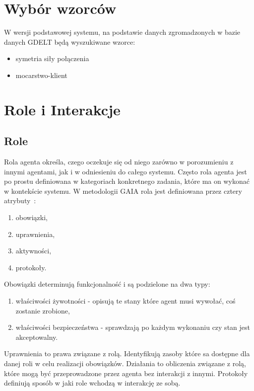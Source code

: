 \documentclass[11pt]{report}
\begin{document}
    \section{Wybór wzorców}\label{sec:wybór-wzorców}


    W wersji podstawowej systemu, na podstawie danych zgromadzonych w bazie danych GDELT będą wyszukiwane wzorce:
    \begin{itemize}
        \item symetria siły połączenia
        \item mocarstwo-klient
    \end{itemize}


    \section{Role i Interakcje}

    \subsection{Role}
    Rola agenta określa, czego oczekuje się od niego zarówno w porozumieniu z innymi agentami, jak i w odniesieniu do całego systemu.
    Często rola agenta jest po prostu definiowana w kategoriach konkretnego zadania, które ma on wykonać w kontekście systemu.
    W metodologii GAIA rola jest definiowana przez cztery atrybuty~\cite{Wooldridge2000a}:
    \begin{enumerate}
        \item obowiązki,
        \item uprawnienia,
        \item aktywności,
        \item protokoły.
    \end{enumerate}
    Obowiązki determinują funkcjonalność i są podzielone na dwa typy:
    \begin{enumerate}
        \item właściwości żywotności - opisują te stany które agent musi wywołać, coś zostanie zrobione,
        \item właściwości bezpieczeństwa - sprawdzają po każdym wykonaniu czy stan jest akceptowalny.
    \end{enumerate}
    Uprawnienia to prawa związane z rolą.
    Identyfikują zasoby które sa dostępne dla danej roli w celu realizacji obowiązków.
    Działania to obliczenia związane z rolą, które mogą być przeprowadzone przez agenta bez interakcji z innymi.
    Protokoły definiują sposób w jaki role wchodzą w interakcję ze sobą.
\end{document}
